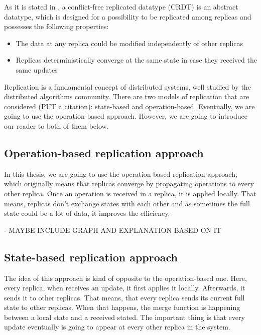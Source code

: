As it is stated in \citet{3}, a conflict-free replicated datatype (CRDT) is an abstract datatype, which is designed for a possibility to be replicated among replicas and possesses the following properties:


    \begin{itemize}
        \item {The data at any replica could be modified independently of other replicas}
        \item {Replicas deterministically converge at the same state in case they received the same updates}
    \end{itemize}

Replication is a fundamental concept of distributed systems, well studied by the distributed algorithms community\cite{2}. There are two models of replication that are considered (PUT a citation): state-based and operation-based. Eventually, we are going to use the operation-based approach. However, we are going to introduce our reader to both of them below. 

\subsection*{Operation-based replication approach}

In this thesis, we are going to use the operation-based replication approach, which originally means that replicas converge by propagating operations to every other replica\cite{3}. Once an operation is received in a replica, it is applied locally. That means, replicas don't exchange states with each other and as sometimes the full state could be a lot of data, it improves the efficiency. 

- MAYBE INCLUDE GRAPH AND EXPLANATION BASED ON IT

\subsection*{State-based replication approach}

The idea of this approach is kind of opposite to the operation-based one. Here, every replica, when receives an update, it first applies it locally. Afterwards, it sends it to other replicas. That means, that every replica sends its current full state to other replicas. When that happens, the merge function is happening between a local state and a received stated. The important thing is that every update eventually is going to appear at every other replica in the system. 

